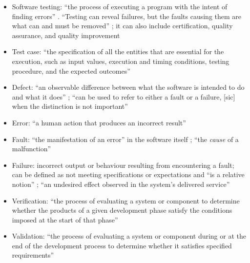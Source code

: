 \begin{itemize}
      \item Software testing: ``the process of executing a program with the
            intent of finding errors'' \citep[p.~438]{PetersAndPedrycz2000}
            . ``Testing can reveal
            failures, but the faults causing them are what can and must be
            removed'' \citep[p.~5-3]{SWEBOK2024}; it can also include
            certification, quality assurance, and quality improvement
            \citep[p.~5-4]{SWEBOK2024}
      \item Test case: ``the specification of all the entities
            that are essential for the execution, such as input values,
            execution and timing conditions, testing procedure, and the
            expected outcomes'' \citep[pp.~5-1 to 5-2]{SWEBOK2024}
      \item Defect: ``an observable difference between what the software is
            intended to do and what it does'' \cite[p.~1-1]{SWEBOK2024}; ``can
            be used to refer to either a fault or a failure, [sic] when the
            distinction is not important'' \cite[p.~4-3]{SWEBOK2014}
      \item Error: ``a human action that produces an incorrect result''
            \citep[p.~399]{vanVliet2000}
      \item Fault: ``the manifestation of an error'' in the software itself
            \citep[p.~400]{vanVliet2000}; ``the \emph{cause} of a malfunction''
            \citep[p.~5-3]{SWEBOK2024}
      \item Failure: incorrect output or behaviour resulting from encountering
            a fault; can be defined as not meeting specifications or
            expectations and ``is a relative notion''
            \citep[p.~400]{vanVliet2000}; ``an undesired effect observed in the
            system's delivered service'' \citep[p.~5-3]{SWEBOK2024}
      \item Verification: ``the process of evaluating a system or component
            to determine whether the products of a given development phase
            satisfy the conditions imposed at the start of that phase''
            \citep[p.~400]{vanVliet2000}
      \item Validation: ``the process of evaluating a system or component
            during or at the end of the development process to determine
            whether it satisfies specified requirements''
            \citep[p.~400]{vanVliet2000}

\end{itemize}
